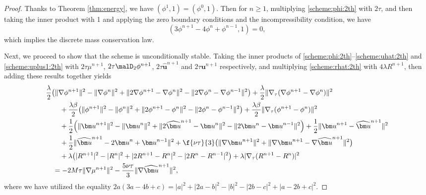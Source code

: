 \begin{proof}
	Thanks to Theorem \ref{thm:energy}, we have	$(\phi^1,1) = (\phi^0,1)$. Then for $n\geq 1$, 
	multiplying \eqref{scheme:phi:2th} with $2\tau$, and then taking the inner product with 1 and applying the zero boundary conditions and the incompressibility condition, we have
	\begin{equation*}
		(3 \phi^{n+1}-4\phi^{n}+\phi^{n-1},1)=0,
	\end{equation*}
	which implies the discrete mass conservation law.
	
	Next, we proceed to show that the scheme is unconditionally stable.
	Taking the inner products of \eqref{scheme:phi:2th}--\eqref{scheme:uhat:2th} and \eqref{scheme:uplus1:2th} with $2\tau \mu^{n+1}$, $2\tau \malD_2 \phi^{n+1}$, $2\tau \widehat{\bm u}^{n+1}$ and $2\tau  {\bm u}^{n+1}$ respectively, and multiplying \eqref{scheme:rhat:2th}  with $4\lambda R^{n+1}$, then adding these results together yields 
	\begin{equation} \label{stable:2th:CH}
		\begin{aligned}
			& \frac{\lambda}{2}\big(\|\nabla \phi^{n+1}\|^2 - \|\nabla \phi^{n}\|^2 + \|2\nabla \phi^{n+1}-\nabla \phi^n\|^2-\|2\nabla \phi^n-\nabla \phi^{n-1}\|^2 \big) + \frac{\lambda}{2} \|\nabla_\tau (\nabla \phi^{n+1} - \nabla \phi^n)\|^2 \\
			& \qquad + \frac{\lambda \beta}{2}\big(\|\phi^{n+1}\|^2  -\|\phi^{n}\|^2+ \|2 \phi^{n+1}-\phi^n\|^2-\|2\phi^n-\phi^{n-1}\|^2 \big) +  \frac{\lambda \beta }{2} \|\nabla_\tau (\phi^{n+1} -  \phi^n)\|^2 \\ 
			& \qquad + \frac{1}{2}\Big(\|{\bm u}^{n+1}\|^2-\|{\bm u}^{n}\|^2  + \|2\widehat{\bm u}^{n+1} - {\bm u}^{n}\|^2-\|2\bm u^{n} - {\bm u}^{n-1}\|^2 \Big) + \frac{1}{2} \|{\bm u}^{n+1}- \widehat{\bm u}^{n+1}\|^2  \\
			& \qquad + \frac{1}{2} \|\widehat{\bm u}^{n+1} - 2 {\bm u}^{n}+{\bm u}^{n-1}  \|^2  + \f{\nu \tau}{3} \big(\| \nabla {\bm u}^{n+1}\|^2   + \| \nabla  {\bm u}^{n+1} - \nabla \widehat{\bm u}^{n+1}\|^2  \big)   \\
			& \qquad + \lambda \big( |R^{n+1}|^2- |R^{n}|^2+|2R^{n+1}-R^n|^2 -|2R^{n}-R^{n-1}|^2 \big) + \lambda |\nabla_\tau (R^{n+1} -  R^n)|^2 \\
			& \quad = -2 M \tau \|\nabla \mu^{n+1}\|^2- \frac{5\nu \tau}{3}   \| \nabla \widehat{\bm u}^{n+1}\|^2, 
		\end{aligned}
	\end{equation}
	where we have utilized the equality $2a(3 a-4 b+c)=|a|^2+|2 a-b|^2-|b|^2-|2 b-c|^2+|a-2 b+c|^2.$


\end{proof}
